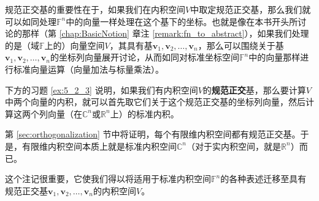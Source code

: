 \begin{remark}
    规范正交基的重要性在于，如果我们在内积空间$V$中取定规范正交基，那么我们就可以如同处理$\mathbb{F}^n$中的向量一样处理在这个基下的坐标。也就是像在本书开头所讨论的那样（第 \ref{chap:BasicNotion} 章注 \ref{remark:fn_to_abstract}），如果我们处理的是（域$\mathbb{F}$上的）向量空间$V$，其具有基$\mathbf{v}_{1},\mathbf{v}_{2},\ldots,\mathbf{v}_{n}$，那么可以围绕关于基$\mathbf{v}_{1},\mathbf{v}_{2},\ldots,\mathbf{v}_{n}$的坐标列向量展开讨论，从而如同对标准坐标空间$\mathbb{F}^n$中的向量那样进行标准向量运算（向量加法与标量乘法）。

    下方的习题 \ref{ex:5_2_3} 说明，如果我们有内积空间$V$的{\bf 规范正交}基，那么要计算$V$中两个向量的内积，就可以首先取它们关于这个规范正交基的坐标列向量，然后计算这两个列向量（在$\mathbb{C}^n$或$\mathbb{R}^n$上）的标准内积。

    第 \ref{sec:orthogonalization} 节中将证明，每个有限维内积空间都有规范正交基。于是，有限维内积空间本质上就是标准内积空间$\mathbb{C}^n$（对于实内积空间，就是$\mathbb{R}^n$）而已。
\end{remark}

这个注记很重要，它使我们得以将适用于标准内积空间$\mathbb{F}^n$的各种表述迁移至具有规范正交基$\mathbf{v}_{1},\mathbf{v}_{2},\ldots,\mathbf{v}_{n}$的内积空间$V$。


